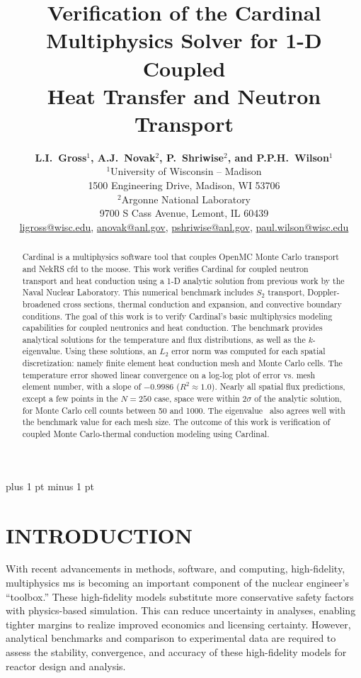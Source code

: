 \documentclass[letterpaper]{mc2023}
\title{Verification of the Cardinal Multiphysics Solver for 1-D Coupled\\
Heat Transfer and Neutron Transport}
\author{%
  \textbf{L.I.~Gross$^1$, A.J.~Novak$^2$, P.~Shriwise$^2$, and P.P.H.~Wilson$^1$}\\
  $^1$University of Wisconsin -- Madison  \\
  1500 Engineering Drive, Madison, WI 53706 \vspace{6pt}\\
  $^2$Argonne National Laboratory \\
  9700 S Cass Avenue, Lemont, IL 60439\vspace{6pt} \\
  \url{ligross@wisc.edu}, \url{anovak@anl.gov}, \url{pshriwise@anl.gov}, \url{paul.wilson@wisc.edu}
}
\begin{document}
\maketitle
\justify
\parskip 6pt plus 1 pt minus 1 pt

\begin{abstract}
Cardinal is a multiphysics software tool that couples OpenMC Monte Carlo transport and NekRS \gls{cfd} to the \gls{moose}. This
work verifies Cardinal for coupled neutron transport and heat conduction using a 1-D analytic solution from previous work by the
Naval Nuclear Laboratory. This numerical benchmark includes $S_2$ transport, Doppler-broadened cross sections, thermal conduction
and expansion, and convective boundary conditions. The goal of this work is to verify Cardinal's basic multiphysics modeling
capabilities for coupled neutronics and heat conduction. The benchmark provides analytical solutions for the temperature and flux
distributions, as well as the $k$-eigenvalue. Using these solutions, an $L_{2}$ error norm was computed for each spatial discretization:
namely finite element heat conduction mesh and Monte Carlo cells. The temperature error showed linear convergence on a log-log plot of
error vs. mesh element number, with a slope of $-0.9986$ ($R^2\approx 1.0$). Nearly all spatial flux predictions, except a few points
in the $N=250$ case, space were within $2\sigma$ of the analytic solution, for Monte Carlo cell counts between 50 and 1000. The
eigenvalue \keff~also agrees well with the benchmark value for each mesh size. The outcome of this work is verification of coupled
Monte Carlo-thermal conduction modeling using Cardinal.
\end{abstract}
\vspace{6pt}

\section{INTRODUCTION}
\label{sec:intro}
With recent advancements in methods, software, and computing, high-fidelity, multiphysics \gls{ms} is becoming an important
component of the nuclear engineer's ``toolbox.'' These high-fidelity models substitute more conservative safety factors
with physics-based simulation. This can reduce uncertainty in analyses, enabling tighter margins to realize improved economics
and licensing certainty. However, analytical benchmarks and comparison to experimental data are required to assess the stability,
convergence, and accuracy of these high-fidelity models for reactor design and analysis.
\end{document}
